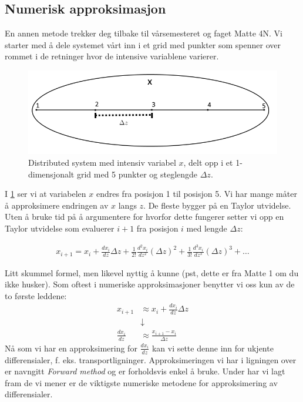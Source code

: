 \subsection{Numerisk approksimasjon}\label{sec:numerisk_approksimasjon}
En annen metode trekker deg tilbake til vårsemesteret og faget Matte 4N. Vi starter med å dele systemet vårt inn i et grid med punkter som spenner over rommet i de retninger hvor de intensive variablene varierer. 
\begin{figure}[H]
    \centering
    \includegraphics[scale=0.5]{Figures/Distributed_discret.png}
    \caption{Distributed system med intensiv variabel $x$, delt opp i et 1-dimensjonalt grid med 5 punkter og steglengde $\Delta z$.}
    \label{fig:distributed_numerisk}
\end{figure}

I \cref{fig:distributed_numerisk} ser vi at variabelen $x$ endres fra posisjon 1 til posisjon 5. Vi har mange måter å approksimere endringen av $x$ langs $z$. De fleste bygger på en Taylor utvidelse. Uten å bruke tid på å argumentere for hvorfor dette fungerer setter vi opp en Taylor utvidelse som evaluerer $i+1$ fra posisjon $i$ med lengde $\Delta z$:

\begin{align}
    x_{i+1} = x_i + \frac{dx_i}{dz}\Delta z + \frac{1}{2!}\frac{d^2x_i}{dz^2}(\Delta z)^2 + \frac{1}{3!}\frac{d^3x_i}{dz^3}(\Delta z)^3 + \dots
\end{align}

Litt skummel formel, men likevel nyttig å kunne (pst, dette er fra Matte 1 om du ikke husker). Som oftest i numeriske approksimasjoner benytter vi oss kun av de to første leddene:
\begin{align}
    x_{i+1} &\approx x_i + \frac{dx_i}{dz}\Delta z\\
    &\downarrow \\
    \frac{dx_i}{dz} &\approx \frac{x_{i+1}-x_i}{\Delta z}
\end{align}
Nå som vi har en approksimering for $\frac{dx_i}{dz}$ kan vi sette denne inn for ukjente differensialer, f. eks. transportligninger. Approksimeringen vi har i ligningen over er navngitt \textit{Forward method} og er forholdsvis enkel å bruke. Under har vi lagt fram de vi mener er de viktigste numeriske metodene for approksimering av differensialer. 

